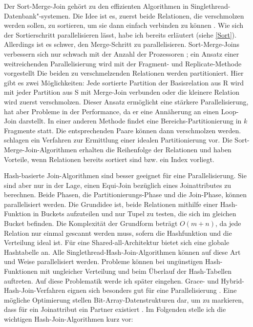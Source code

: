 \documentclass[a4paper,12pt,twoside]{article}
\begin{document}
Der Sort-Merge-Join gehört zu den effizienten Algorithmen in Singlethread-Datenbank"-systemen. Die Idee ist es, zuerst beide Relationen, die verschmolzen werden sollen, zu sortieren, um sie dann einfach verbinden zu können \parencite[S. 149]{Lu1994}. Wie sich der Sortierschritt parallelisieren lässt, habe ich bereits erläutert (siehe \autoref{Sort}). Allerdings ist es schwer, den Merge-Schritt zu parallelisieren. Sort-Merge-Joins verbessern sich nur schwach mit der Anzahl der Prozessoren \parencite{Yu1998}; ein Ansatz einer weitreichenden Parallelisierung wird mit der Fragment- und Replicate-Methode vorgestellt \parencite {Richardson1987} Die beiden zu verschmelzenden Relationen werden partitioniert. Hier gibt es zwei Möglichkeiten: Jede sortierte Partition der Basisrelation aus R wird mit jeder Partition aus S mit Merge-Join verbunden oder die kleinere Relation wird zuerst verschmolzen. Dieser Ansatz ermöglicht eine stärkere Parallelisierung, hat aber Probleme in der Performance, da er eine Annäherung an einen Loop-Join darstellt. In einer anderen Methode findet eine Bereichs-Partitionierung in $k$ Fragmente statt. Die entsprechenden Paare können dann verschmolzen werden. \textcite{Iyer1989} schlagen ein Verfahren zur Ermittlung einer idealen Partitionierung vor. Die Sort-Merge-Join-Algorithmen erhalten die Reihenfolge der Relationen und haben Vorteile, wenn Relationen bereits sortiert sind bzw. ein Index vorliegt.

Hash-basierte Join-Algorithmen sind besser geeignet für eine Parallelisierung. Sie sind aber nur in der Lage, einen Equi-Join bezüglich eines Joinattributes zu berechnen. Beide Phasen, die Partitionierungs-Phase und die Join-Phase, können parallelisiert werden. Die Grundidee ist, beide Relationen mithilfe einer Hash-Funktion in Buckets aufzuteilen und nur Tupel zu testen, die sich im gleichen Bucket befinden. Die Komplexität der Grundform beträgt $O(m + n)$, da jede Relation nur einmal gescannt werden muss, sofern die Hashfunktion und die Verteilung ideal ist. Für eine Shared-all-Architektur bietet sich eine globale Hashtabelle an. Alle Singlethread-Hash-Join-Algorithmen können auf diese Art und Weise parallelisiert werden. Probleme können bei ungünstigen Hash-Funktionen mit ungleicher Verteilung und beim Überlauf der Hash-Tabellen auftreten. Auf diese Problematik werde ich später eingehen. Grace- und Hybrid-Hash-Join-Verfahren eignen sich besonders gut für eine Parallelisierung \parencite{DeWitt1985}. Eine mögliche Optimierung stellen Bit-Array-Datenstrukturen dar, um zu markieren, dass für ein Joinattribut ein Partner existiert \parencite{Valduriez1984}. Im Folgenden stelle ich die wichtigen Hash-Join-Algorithmen kurz vor:
\end{document}
